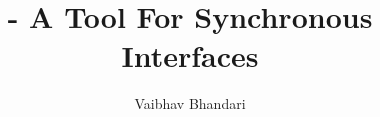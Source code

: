 \documentclass[11pt]{ucscthesis}
\title{ \chai - A Tool For Synchronous Interfaces}
\author{Vaibhav Bhandari}
\begin{document}
\maketitle
\copyrightpage
\tableofcontents
\listoffigures
\listoftables

\begin{acknowledgements}

\end{acknowledgements}
\clearpage
{}






\appendix




\end{document}
